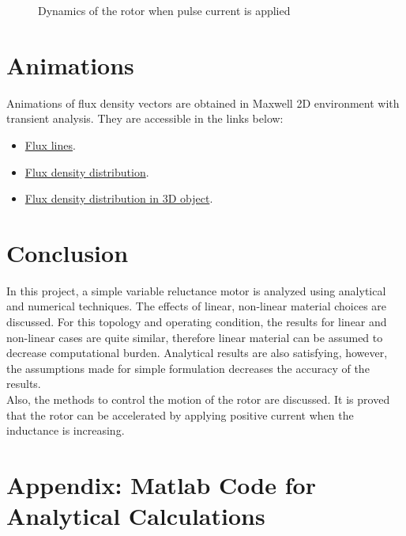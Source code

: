 \documentclass{reportClass}
\begin{document}
\begin{figure}[h!]
    \centering
       \hspace{0.5cm}

  \caption{Dynamics of the rotor when pulse current is applied}
  \label{fig:energy_nonlin} 
\end{figure}

\section{Animations}

Animations of flux density vectors are obtained in Maxwell 2D environment with transient analysis. They are accessible in the links below:

\begin{itemize}
\item \href{https://github.com/ghandeb/EE568/blob/master/Project_1/kepce.gif}{Flux lines}.
\item \href{https://github.com/ghandeb/EE568/blob/master/Project_1/kepce2.gif}{Flux density distribution}.
\item \href{https://github.com/ghandeb/EE568/blob/master/Project_1/kepce3d.gif}{Flux density distribution in 3D object}.
\end{itemize}


\section{Conclusion}

In this project, a simple variable reluctance motor is analyzed using analytical and numerical techniques. The effects of linear, non-linear material choices are discussed. For this topology and operating condition, the results for linear and non-linear cases are quite similar, therefore linear material can be assumed to decrease computational burden. Analytical results are also satisfying, however, the assumptions made for simple formulation decreases the accuracy of the results.\\

Also, the methods to control the motion of the rotor are discussed. It is proved that the rotor can be accelerated by applying positive current when the inductance is increasing.


\newpage 

\section*{Appendix: Matlab Code for Analytical Calculations}


\end{document}
